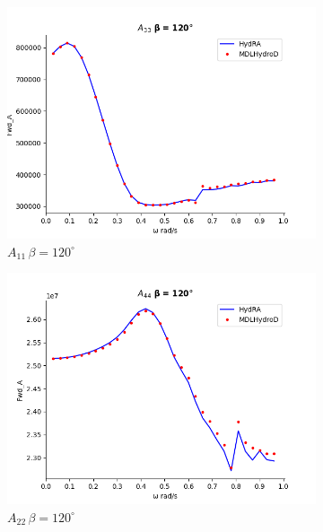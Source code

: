 \begin{figure}[H]
    \vspace{5pt}%
    \begin{subfigure}[b]{0.45\textwidth}
        \includegraphics[width=\textwidth]{plots/kvlcc/added_mass/a33.png}
        \caption{$A_{11}\, \beta = 120^{\circ}$}
    \end{subfigure}
    \begin{subfigure}[b]{0.45\textwidth}
        \includegraphics[width=\textwidth]{plots/kvlcc/added_mass/a44.png}
        \caption{$A_{22} \, \beta = 120^{\circ}$}
    \end{subfigure}
    \vspace{5pt}%
    \begin{subfigure}[b]{0.45\textwidth}

\end{subfigure}
\end{figure}
